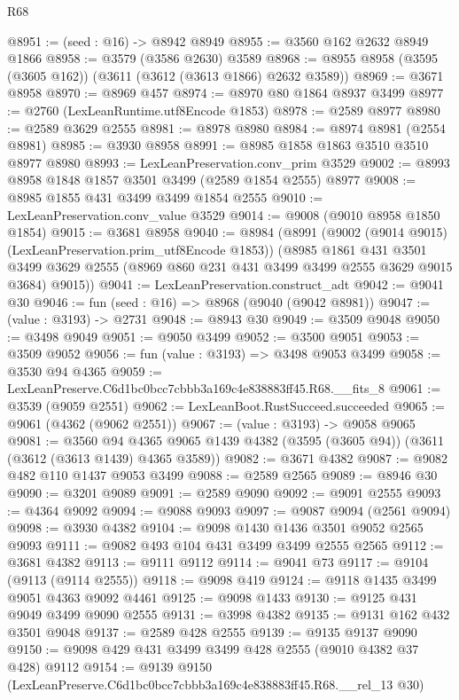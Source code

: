 \begin{lexlean}{R68}
\begin{coremodule}
@8951 := (seed : @16) -> @8942 @8949
@8955 := @3560 @162 @2632 @8949 @1866
@8958 := @3579 (@3586 @2630) @3589
@8968 := @8955 @8958 (@3595 (@3605 @162)) (@3611 (@3612 (@3613 @1866) @2632 @3589))
@8969 := @3671 @8958
@8970 := @8969 @457
@8974 := @8970 @80 @1864 @8937 @3499
@8977 := @2760 (LexLeanRuntime.utf8Encode @1853)
@8978 := @2589 @8977
@8980 := @2589 @3629 @2555
@8981 := @8978 @8980
@8984 := @8974 @8981 (@2554 @8981)
@8985 := @3930 @8958
@8991 := @8985 @1858 @1863 @3510 @3510 @8977 @8980
@8993 := LexLeanPreservation.conv_prim @3529
@9002 := @8993 @8958 @1848 @1857 @3501 @3499 (@2589 @1854 @2555) @8977
@9008 := @8985 @1855 @431 @3499 @3499 @1854 @2555
@9010 := LexLeanPreservation.conv_value @3529
@9014 := @9008 (@9010 @8958 @1850 @1854)
@9015 := @3681 @8958
@9040 := @8984
    (@8991
      (@9002 (@9014 @9015) (LexLeanPreservation.prim_utf8Encode @1853))
      (@8985
        @1861
        @431
        @3501
        @3499
        @3629
        @2555
        (@8969 @860 @231 @431 @3499 @3499 @2555 @3629 @9015 @3684)
        @9015))
@9041 := LexLeanPreservation.construct_adt
@9042 := @9041 @30
@9046 := fun (seed : @16) => @8968 (@9040 (@9042 @8981))
@9047 := (value : @3193) -> @2731
@9048 := @8943 @30
@9049 := @3509 @9048
@9050 := @3498 @9049
@9051 := @9050 @3499
@9052 := @3500 @9051
@9053 := @3509 @9052
@9056 := fun (value : @3193) => @3498 @9053 @3499
@9058 := @3530 @94 @4365
@9059 := LexLeanPreserve.C6d1bc0bcc7cbbb3a169c4e838883ff45.R68.__fits_8
@9061 := @3539 (@9059 @2551)
@9062 := LexLeanBoot.RustSucceed.succeeded
@9065 := @9061 (@4362 (@9062 @2551))
@9067 := (value : @3193) -> @9058 @9065
@9081 := @3560
    @94
    @4365
    @9065
    @1439
    @4382
    (@3595 (@3605 @94))
    (@3611 (@3612 (@3613 @1439) @4365 @3589))
@9082 := @3671 @4382
@9087 := @9082 @482 @110 @1437 @9053 @3499
@9088 := @2589 @2565
@9089 := @8946 @30
@9090 := @3201 @9089
@9091 := @2589 @9090
@9092 := @9091 @2555
@9093 := @4364 @9092
@9094 := @9088 @9093
@9097 := @9087 @9094 (@2561 @9094)
@9098 := @3930 @4382
@9104 := @9098 @1430 @1436 @3501 @9052 @2565 @9093
@9111 := @9082 @493 @104 @431 @3499 @3499 @2555 @2565
@9112 := @3681 @4382
@9113 := @9111 @9112
@9114 := @9041 @73
@9117 := @9104 (@9113 (@9114 @2555))
@9118 := @9098 @419
@9124 := @9118 @1435 @3499 @9051 @4363 @9092 @4461
@9125 := @9098 @1433
@9130 := @9125 @431 @9049 @3499 @9090 @2555
@9131 := @3998 @4382
@9135 := @9131 @162 @432 @3501 @9048
@9137 := @2589 @428 @2555
@9139 := @9135 @9137 @9090
@9150 := @9098 @429 @431 @3499 @3499 @428 @2555 (@9010 @4382 @37 @428) @9112
@9154 := @9139 @9150 (LexLeanPreserve.C6d1bc0bcc7cbbb3a169c4e838883ff45.R68.__rel_13 @30)

\end{coremodule}
\end{lexlean}
